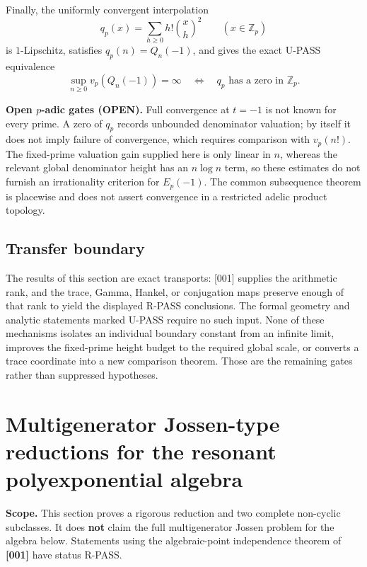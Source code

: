 \documentclass[11pt]{article}
\theoremstyle{keio}
\theoremstyle{definition}
\theoremstyle{remark}
\newcommand{\Z}{\mathbb Z}
\newcommand{\UPASS}{\textcolor{keiogreen}{\textsf{U-PASS}}}
\newcommand{\RPASS}{\textcolor{keioxblue}{\textsf{R-PASS}}}
\newcommand{\OPEN}{\textcolor{keioopen}{\textsf{OPEN}}}
\begin{document}
Finally, the uniformly convergent interpolation
\[
 q_p(x)=\sum_{h\ge0}h!\binom xh^2\qquad(x\in\Z_p)
\]
is \(1\)-Lipschitz, satisfies \(q_p(n)=Q_n(-1)\), and gives the exact
\UPASS{} equivalence
\[
 \sup_{n\ge0}v_p(Q_n(-1))=\infty
 \quad\Longleftrightarrow\quad
 q_p\text{ has a zero in }\Z_p.
\]

\begin{statusbox}
\textbf{Open \(p\)-adic gates (\OPEN).}
Full convergence at \(t=-1\) is not known for every prime.  A zero of
\(q_p\) records unbounded denominator valuation; by itself it does not
imply failure of convergence, which requires comparison with
\(v_p(n!)\).  The fixed-prime valuation gain supplied here is only linear
in \(n\), whereas the relevant global denominator height has an
\(n\log n\) term, so these estimates do not furnish an irrationality
criterion for \(E_p(-1)\).  The common subsequence theorem is placewise and
does not assert convergence in a restricted adelic product topology.
\end{statusbox}

\subsection{Transfer boundary}

The results of this section are exact transports: [001] supplies the
arithmetic rank, and the trace, Gamma, Hankel, or conjugation maps preserve
enough of that rank to yield the displayed \RPASS{} conclusions.  The
formal geometry and analytic statements marked \UPASS{} require no such
input.  None of these mechanisms isolates an individual boundary constant
from an infinite limit, improves the fixed-prime height budget to the
required global scale, or converts a trace coordinate into a new comparison
theorem.  Those are the remaining gates rather than suppressed hypotheses.
\section{Multigenerator Jossen-type reductions for the resonant polyexponential algebra}

\begin{notebox}
\textbf{Scope.}  This section proves a rigorous reduction and two complete
non-cyclic subclasses.  It does \textbf{not} claim the full multigenerator
Jossen problem for the algebra below.  Statements using the algebraic-point
independence theorem of \textbf{[001]} have status \RPASS{}.
\end{notebox}
\end{document}
